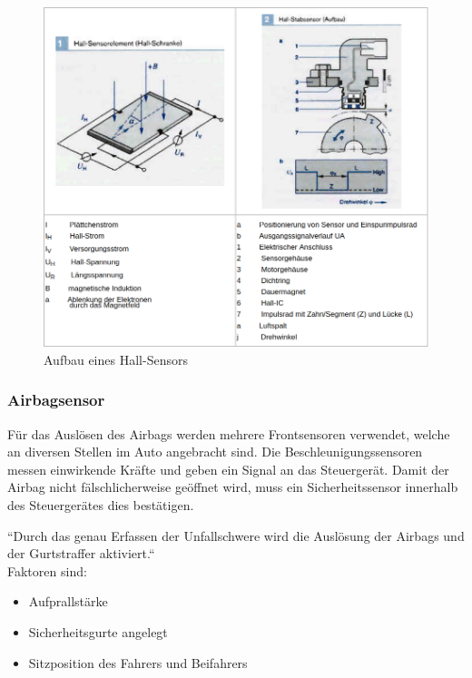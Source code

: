 \begin{flushleft}
					\begin{figure}[h]
						\centering
						\includegraphics[width=\textwidth]{hall.png}
						\caption[www.kfztech.de/kfztechnik/elo/sensoren/hallsensor.htm]{Aufbau eines Hall-Sensors}
	                \end{figure}
	                
	                
	
				\subsubsection{Airbagsensor}
	
	                 Für das Auslösen des Airbags werden mehrere Frontsensoren verwendet, welche an diversen Stellen im Auto angebracht sind. Die Beschleunigungssensoren messen einwirkende Kräfte und geben ein Signal an das Steuergerät.
	                 Damit der Airbag nicht fälschlicherweise geöffnet wird, muss ein Sicherheitssensor innerhalb des Steuergerätes dies bestätigen. 
	                 
	                 ``Durch das genau Erfassen der Unfallschwere wird die Auslösung der Airbags und der Gurtstraffer aktiviert.`` \cite{TS_airbag}\\
	                 Faktoren sind: 
	                 
	                 \begin{itemize}
	                     \item Aufprallstärke
	                     \item Sicherheitsgurte angelegt
	                     \item Sitzposition des Fahrers und Beifahrers
	                 \end{itemize}
	             

\end{flushleft}
